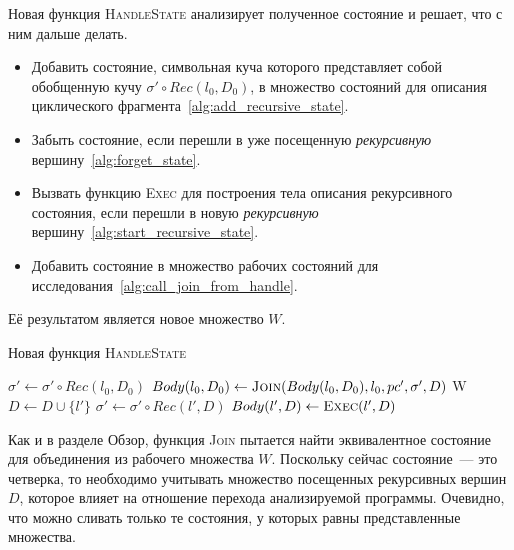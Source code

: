 Новая функция \textsc{HandleState} анализирует полученное состояние и решает, что с ним дальше делать.
\begin{itemize}
    \item Добавить состояние, символьная куча которого представляет собой обобщенную кучу $\sigma' \circ Rec(l_0,D_0)$, в множество состояний для описания циклического фрагмента~\ref{alg:add_recursive_state}.
    \item Забыть состояние, если перешли в уже посещенную \emph{рекурсивную} вершину~\ref{alg:forget_state}.
    \item Вызвать функцию \textsc{Exec} для построения тела описания рекурсивного состояния, если перешли в новую \emph{рекурсивную} вершину~\ref{alg:start_recursive_state}.
    \item Добавить состояние в множество рабочих состояний для исследования~\ref{alg:call_join_from_handle}.
\end{itemize}
Её результатом является новое множество $W$.

\begin{algorithm}[H]
    \caption{Новая функция \textsc{HandleState}} \label{new_handle_state}
\begin{algorithmic}[1]
         \label{alg:deal_with_new_state_start}
            \State $\sigma' \gets \sigma' \circ Rec(l_0,D_0)$
            \State $Body(l_0,D_0) \gets \text{\textsc{Join}($Body(l_0,D_0), l_0, pc',\sigma',D$)}$
            \State \Return W \label{alg:add_recursive_state}
         \label{alg:forget_state}
            \State \Return
            \State $D \gets D \cup \{l'\}$
            \State $\sigma' \gets \sigma' \circ Rec(l',D)$ \label{alg:enter_recursive_symbol}
                \State $Body(l',D) \gets \text{\textsc{Exec}}(l',D)$ \label{alg:start_recursive_state}
            \EndIf
        \EndIf

        \State \Return {} \label{alg:call_join_from_handle}\;
    \EndProcedure
\end{algorithmic}
\end{algorithm}

Как и в разделе Обзор, функция \textsc{Join} пытается найти эквивалентное состояние для объединения из рабочего множества $W$. Поскольку сейчас состояние~--- это четверка, то необходимо учитывать множество посещенных рекурсивных вершин $D$, которое влияет на отношение перехода анализируемой программы.
Очевидно, что можно сливать только те состояния, у которых равны представленные множества.

